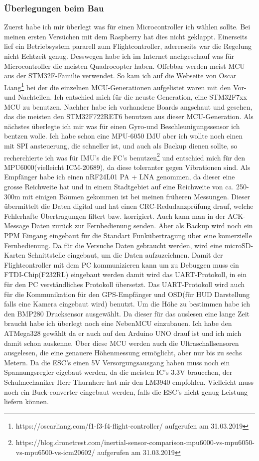 \documentclass[12pt,a4paper, ngerman]{article}
\begin{document}
\subsubsection{Überlegungen beim Bau}
Zuerst habe ich mir überlegt was für einen Microcontroller ich wählen sollte. Bei meinen ersten Versüchen mit dem Raspberry hat dies nicht geklappt. Einerseits lief ein Betriebsystem pararell zum Flightcontroller, adererseits war die Regelung nicht Echtzeit genug. Desswegen habe ich im Internet nachgeschauf was für Microcontroller die meisten Quadrocopter haben. Offebbar werden meist MCU aus der STM32F-Familie verwendet. So kam ich auf die Webseite von Oscar Liang\footnote{\label{foot:1}https://oscarliang.com/f1-f3-f4-flight-controller/ aufgerufen am 31.03.2019} bei der die einzelnen MCU-Generationen aufgelistet waren mit den Vor-und Nachteilen. Ich entschied mich für die neuste Generation, eine STM32F7xx MCU zu benutzen. Nachher habe ich vorhandene Boards angschaut und gesehen, das die meisten den STM32F722RET6 benutzen aus dieser MCU-Generation. Als nächstes überlegte ich mir was für einen Gyro-und Beschleunigungssensor ich bentzen wolle. Ich habe schon eine MPU-6050 IMU aber ich wollte noch einen mit SPI ansteuerung, die schneller ist, und auch als Backup dienen sollte, so recherchierte ich was für IMU's die FC's benutzen\footnote{\label{foot:2}https://blog.dronetrest.com/inertial-sensor-comparison-mpu6000-vs-mpu6050-vs-mpu6500-vs-icm20602/ aufgerufen am 31.03.2019} und entschied mich für den MPU6000(vielleicht ICM-20689), da diese toleranter gegen Vibrationen sind. Als Empfänger habe ich einen nRF24L01 PA + LNA genommen, da dieser eine grosse Reichweite hat und in einem Stadtgebiet auf eine Reichweite von ca. 250-300m mit einigen Bäumen gekommen ist bei meinen früheren Messungen. Dieser übermittelt die Daten digital und hat einen CRC-Redudanzprüfung drauf, welche Fehlerhafte Übertragungen filtert bzw. korrigiert. Auch kann man in der ACK-Message Daten zurück zur Fernbedienung senden. Aber als Backup wird noch ein PPM Eingang eingebaut für die Standart Funkübertragung über eine komerzielle Fernbedienung. Da für die Versuche Daten gebraucht werden, wird eine microSD-Karten Schnittstelle eingebaut, um die Daten aufzuzeichnen. Damit der Flightcontroller mit dem PC kommunizieren kann um zu Debuggen muss ein FTDI-Chip(F232RL) eingebaut werden damit wird das UART-Protokoll, in ein für den PC verständliches Protokoll übersetzt. Das UART-Protokoll wird auch für die Kommunikation für den GPS-Empfänger und OSD(für HUD Darstellung falls eine Kamera eingebaut wird) benutzt. Um die Höhe zu bestimmen habe ich den BMP280 Drucksensor ausgewählt. Da dieser für das auslesen eine lange Zeit braucht habe ich überlegt noch eine NebenMCU einzubauen. Ich habe den ATMega328 gewählt da er auch auf den Arduino UNO drauf ist und ich mich damit schon auskenne. Über diese MCU werden auch die Ultraschallsensoren ausgelesen, die eine genauere Höhenmessung ermöglicht, aber nur bis zu sechs Metern. Da die ESC's einen 5V Versorgungsausgang haben muss noch ein Spannungsregler  eigebaut werden, da die meisten IC's 3.3V braucchen, der Schulmechaniker Herr Thurnherr hat mir den LM3940 empfohlen. Vielleicht muss noch ein Buck-converter eingebaut  werden, falls die ESC's nicht genug Leistung liefern können.
\end{document}
